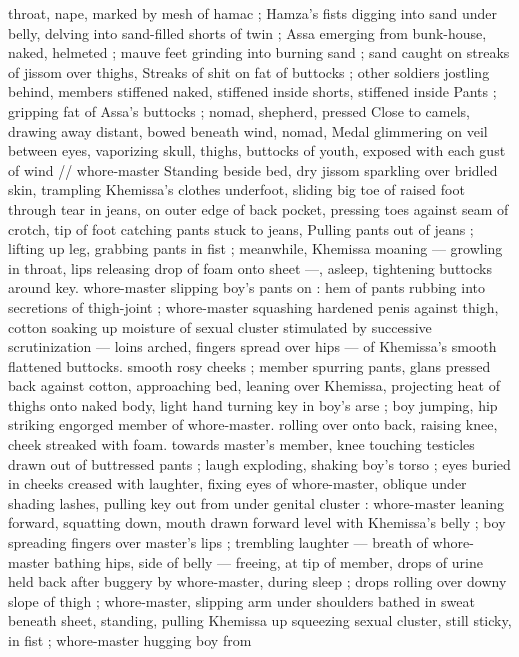 throat, nape, marked by mesh of hamac ; Hamza's fists digging into 
sand under belly, delving into sand-filled shorts of twin ; Assa 
emerging from bunk-house, naked, helmeted ; mauve feet grinding 
into burning sand ; sand caught on streaks of jissom over thighs, 
Streaks of shit on fat of buttocks ; other soldiers jostling behind, 
members stiffened naked, stiffened inside shorts, stiffened inside 
Pants ; gripping fat of Assa's buttocks ; nomad, shepherd, pressed 
Close to camels, drawing away distant, bowed beneath wind, nomad, 
Medal glimmering on veil between eyes, vaporizing skull, thighs, 
buttocks of youth, exposed with each gust of wind {\slash}{\slash} whore-master 
Standing beside bed, dry jissom sparkling over bridled skin, 
trampling Khemissa's clothes underfoot, sliding big toe of raised foot 
through tear in jeans, on outer edge of back pocket, pressing toes 
against seam of crotch, tip of foot catching pants stuck to jeans, 
Pulling pants out of jeans ; lifting up leg, grabbing pants in fist ; 
meanwhile, Khemissa moaning --- growling in throat, lips releasing 
drop of foam onto sheet ---, asleep, tightening buttocks around key. 
whore-master slipping boy's pants on : hem of pants rubbing into 
secretions of thigh-joint ; whore-master squashing hardened penis 
against thigh, cotton soaking up moisture of sexual cluster 
stimulated by successive scrutinization --- loins arched, fingers 
spread over hips --- of Khemissa's smooth flattened buttocks. 
smooth rosy cheeks ; member spurring pants, glans pressed back 
against cotton, approaching bed, leaning over Khemissa, projecting 
heat of thighs onto naked body, light hand turning key in boy's arse 
; boy jumping, hip striking engorged member of whore-master. 
rolling over onto back, raising knee, cheek streaked with foam. 
towards master's member, knee touching testicles drawn out of 
buttressed pants ; laugh exploding, shaking boy's torso ; eyes buried 
in cheeks creased with laughter, fixing eyes of whore-master, oblique 
under shading lashes, pulling key out from under genital cluster : 
whore-master leaning forward, squatting down, mouth drawn forward 
level with Khemissa's belly ; boy spreading fingers over master's lips 
; trembling laughter --- breath of whore-master bathing hips, side of 
belly --- freeing, at tip of member, drops of urine held back after 
buggery by whore-master, during sleep ; drops rolling over downy 
slope of thigh ; whore-master, slipping arm under shoulders bathed 
in sweat beneath sheet, standing, pulling Khemissa up squeezing 
sexual cluster, still sticky, in fist ; whore-master hugging boy from 

